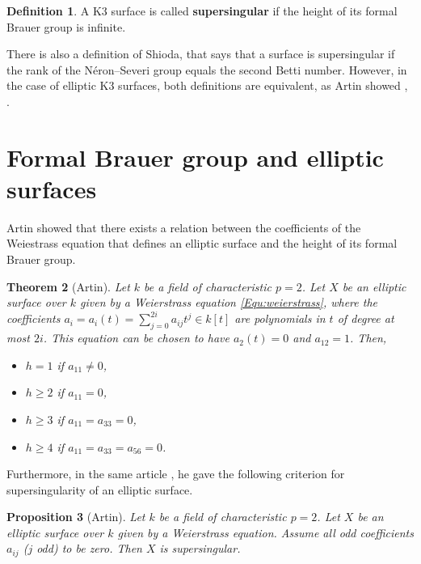 \documentclass{report}
\newtheorem{theorem}{Theorem}[chapter]
\newtheorem{proposition}[theorem]{Proposition}
\theoremstyle{definition}
\newtheorem{definition}[theorem]{Definition}
\begin{document}
\begin{definition}
A K3 surface is called \textbf{supersingular} if the height of its formal Brauer group is infinite.
\end{definition}

There is also a definition of Shioda, that says that a surface is supersingular if the rank of the N\'{e}ron--Severi group equals the second Betti number. However, in the case of elliptic K3 surfaces, both definitions are equivalent, as Artin showed \cite[Theorem~0.1]{artin1974supersingular}, \cite[Theorem~1.7]{artin1974supersingular}.

\section{Formal Brauer group and elliptic surfaces}

Artin \cite[Theorem~2.12]{artin1974supersingular} showed that there exists a relation between the coefficients of the Weiestrass equation that defines an elliptic surface and the height of its formal Brauer group.

\begin{theorem}[Artin]
Let $k$ be a field of characteristic $p=2$. Let $X$ be an elliptic surface over $k$ given by a Weierstrass equation \eqref{Equ:weierstrass}, where the coefficients $a_i=a_i(t)=\sum_{j=0}^{2i}a_{ij}t^j\in k[t]$ are polynomials in $t$ of degree at most $2i$. This equation can be chosen to have $a_2(t)=0$ and $a_{12}=1$. Then,
\begin{itemize}
\item $h=1$ if $a_{11}\neq0$,
\item $h\geq2$ if $a_{11}=0$,
\item $h\geq3$ if $a_{11}=a_{33}=0$,
\item $h\geq4$ if $a_{11}=a_{33}=a_{56}=0$.
\end{itemize}
\end{theorem}

Furthermore, in the same article \cite[Proposition~2.13]{artin1974supersingular}, he gave the following criterion for supersingularity of an elliptic surface.

\begin{proposition}[Artin]
Let $k$ be a field of characteristic $p=2$. Let $X$ be an elliptic surface over $k$ given by a Weierstrass equation. Assume all odd coefficients $a_{ij}$ ($j$ odd) to be zero. Then $X$ is supersingular.
\end{proposition}
\end{document}
